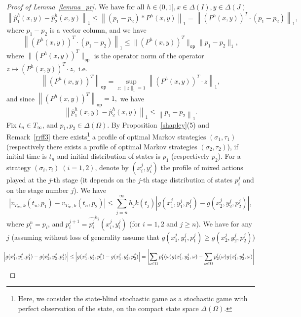 \documentclass[english,openary,12pt]{article}
\theoremstyle{definition}
\begin{document}
\begin{proof}[Proof of Lemma~\ref{lemma_pr}]
We have for all $h \in (0,1], x \in \Delta(I), y \in \Delta(J)$
$$\left\|\widehat p_1^h(x,y) - \widehat p_2^h(x,y) \right\|_1 \le 
\left\| (p_1 - p_2) * P^h(x,y) \right\|_1 = 
\left\| (P^h(x,y))^T \cdot (p_1 - p_2) \right\|_1,$$
where $p_1 - p_2$ is a vector column, and we have
$$\left\| (P^h(x,y))^T \cdot (p_1 - p_2) \right\|_1 \le
\|(P^h(x,y))^T\|_{\texttt{op}} \|p_1 - p_2\|_1,$$
where
$\|(P^h(x,y))^T\|_{\texttt{op}}$
is the operator norm of the operator $z \mapsto (P^h(x,y))^T \cdot z,$ i.e.
$$\left\|(P^h(x,y))^T\right\|_{\texttt{op}} = \sup_{z : \|z\|_1 = 1}
\left\|(P^h(x,y))^T \cdot z\right\|_1,$$
and since
$\left\|(P^h(x,y))^T \right\|_{\texttt{op}} = 1,$
we have
\begin{equation}
\left\|\widehat p_1^h(x,y) - \widehat p_2^h(x,y) \right\|_1 \le 
\left\| p_1 - p_2 \right\|_1.
\label{3788}
\end{equation}
Fix $t_n \in T_\infty$, and $p_1, p_2 \in \Delta(\Omega)$. 
By Proposition~\ref{shapley}(5) and Remark~\ref{rrff3}
there exists\footnote{Here, we consider the state-blind stochastic game as a stochastic game with perfect observation of the state, on the compact state space $\Delta(\Omega)$.} a profile of optimal Markov strategies $(\sigma_1, \tau_1)$ 
(respectively there exists a profile of optimal Markov strategies 
$(\sigma_2, \tau_2)$), 
if initial time is $t_n$ and initial distribution of states is $p_1$ 
(respectively $p_2$). For a strategy 
$(\sigma_i, \tau_i) \; (i = 1, 2)$, denote by
$(x_i^j,y_i^j)$ the profile of mixed actions played at the $j$-th stage 
(it depends on the $j$-th stage distribution of states $p_i^j$ and on the stage number $j$). 
We have
\begin{equation}
\left|v_{T_\infty,k}(t_n, p_1) - 
v_{T_\infty,k}(t_n, p_2) \right| \le  
\sum_{j = n}^\infty h_j k(t_j) 
\left|g(x_1^j,y_1^j,p_1^j) - g(x_2^j,y_2^j,p_2^j)\right|,
\label{975}
\end{equation}
where $p_i^{n} = p_i$, and $p^{j+1}_i = \widehat{p^j_i}^{h_j} (x^j_i,y^j_i)$ (for $i=1,2$ and $j \ge n$).
We have for any $j$ (assuming without loss of generality assume that
$g(x_1^j,y_1^j,p_1^j) \ge g(x_2^j,y_2^j,p_2^j)$)
\begin{align}
\hspace{-0.3cm}
\begin{split}
  \left|g(x_1^j,y_1^j,p_1^j) - g(x_2^j,y_2^j,p_2^j)\right| \le 
  &\left|g(x_1^j,y_2^j,p_1^j) - g(x_1^j,y_2^j,p_2^j)\right|
  = \left|\sum_{\omega \in \Omega} p_{1}^j(\omega ) g(x_1^j,y_2^j,\omega ) -
  \sum_{\omega  \in \Omega} p_{2}^j(\omega) g(x_1^j,y_2^j,\omega)\right| \\

\end{split}
\end{align}
\end{proof}
\end{document}
